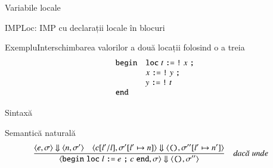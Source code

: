 \begin{section}{Variabile locale}
\begin{frame}{IMPLoc: IMP cu declarații locale în blocuri}
\begin{block}{Exemplu}{Interschimbarea valorilor a două locații folosind o a treia}
\[\begin{array}{ll}
\mathrel{\text{\ttfamily begin}} & \mathrel{\text{\ttfamily loc}} t \mathrel{\text{\ttfamily :=}} {\mathrel{\text{\ttfamily !}} x} \mathrel{\text{\ttfamily ;}}
\\
& x \mathrel{\text{\ttfamily :=}} {\mathrel{\text{\ttfamily !}} y} \mathrel{\text{\ttfamily ;}}
\\
& y \mathrel{\text{\ttfamily :=}} {\mathrel{\text{\ttfamily !}} t} 
\\
\mathrel{\text{\ttfamily end}}
\end{array}\]
\end{block}
\end{frame}
\begin{frame}{Sintaxă}
\vspace{-5ex}
\end{frame}

\begin{frame}{Semantică naturală}
\[\reg{\S{\c{\Sbegin {\Sloc l \terminal{:=} e} \terminal{;} c \Send, \sigma}}{\c{\Sskip, \sigma''}}}{
\S{\c{e,\sigma}}{\c{n,\sigma'}}\si \S{\c{c[l'/l],\sigma'[l' \mapsto n]}}{\c{\Sskip, \sigma''[l'\mapsto n']}}
}{unde}\]


\end{frame}
\end{section}
